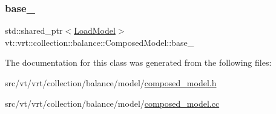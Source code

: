 \subsubsection{\texorpdfstring{base\+\_\+}{base\_}}
{\footnotesize\ttfamily std\+::shared\+\_\+ptr$<$\hyperlink{classvt_1_1vrt_1_1collection_1_1balance_1_1_load_model}{Load\+Model}$>$ vt\+::vrt\+::collection\+::balance\+::\+Composed\+Model\+::base\+\_\+\hspace{0.3cm}{\ttfamily [private]}}



The documentation for this class was generated from the following files\+:\begin{DoxyCompactItemize}
\item 
src/vt/vrt/collection/balance/model/\hyperlink{composed__model_8h}{composed\+\_\+model.\+h}\item 
src/vt/vrt/collection/balance/model/\hyperlink{composed__model_8cc}{composed\+\_\+model.\+cc}\end{DoxyCompactItemize}
